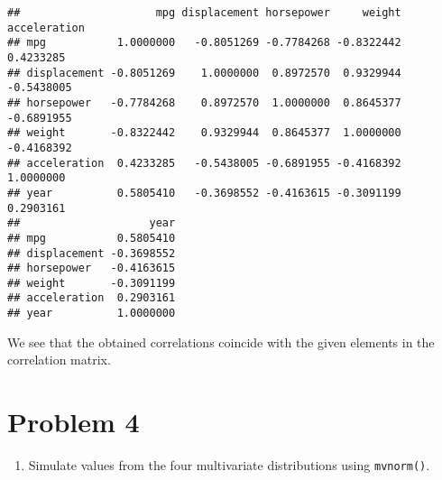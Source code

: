 \documentclass[]{article}
\providecommand{\tightlist}{%
  \setlength{\itemsep}{0pt}\setlength{\parskip}{0pt}}
\begin{document}
\begin{verbatim}
##                     mpg displacement horsepower     weight acceleration
## mpg           1.0000000   -0.8051269 -0.7784268 -0.8322442    0.4233285
## displacement -0.8051269    1.0000000  0.8972570  0.9329944   -0.5438005
## horsepower   -0.7784268    0.8972570  1.0000000  0.8645377   -0.6891955
## weight       -0.8322442    0.9329944  0.8645377  1.0000000   -0.4168392
## acceleration  0.4233285   -0.5438005 -0.6891955 -0.4168392    1.0000000
## year          0.5805410   -0.3698552 -0.4163615 -0.3091199    0.2903161
##                    year
## mpg           0.5805410
## displacement -0.3698552
## horsepower   -0.4163615
## weight       -0.3091199
## acceleration  0.2903161
## year          1.0000000
\end{verbatim}

We see that the obtained correlations coincide with the given elements
in the correlation matrix.

\hypertarget{problem-4}{%
\section{Problem 4}\label{problem-4}}

\begin{enumerate}
\def\labelenumi{\alph{enumi})}
\tightlist
\item
  Simulate values from the four multivariate distributions using
  \texttt{mvnorm()}.
\end{enumerate}
\end{document}

